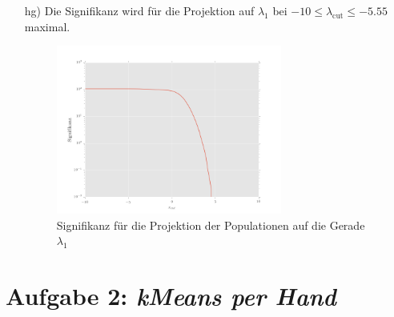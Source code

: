 \begin{itemize}
\item[hg)] Die Signifikanz wird für die Projektion auf $\lambda_1$ bei $-10 \leq \lambda_{\text{cut}} \leq -5.55$ maximal.
\begin{figure}[H]
	\centering
	\includegraphics[width=0.7\textwidth]{signifikanz_h.png}
	\caption{Signifikanz für die Projektion der Populationen auf die Gerade $\lambda_1$}
\end{figure}



\end{itemize}
\section*{Aufgabe 2: \emph{kMeans per Hand}}


